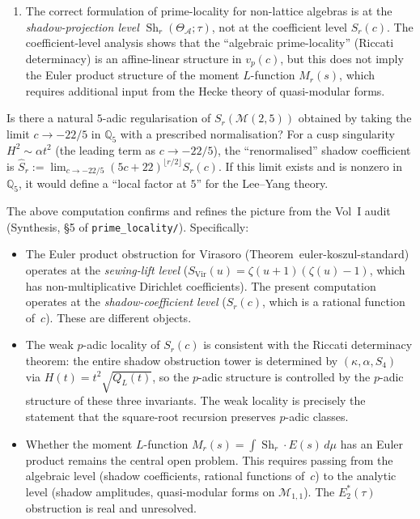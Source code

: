 \documentclass[11pt]{article}
\newcommand{\cA}{\mathcal{A}}
\newcommand{\cM}{\mathcal{M}}
\newcommand{\Q}{\mathbb{Q}}
\begin{document}
\begin{enumerate}[label=\textup{(\arabic*)}]
\item The correct formulation of prime-locality for non-lattice
  algebras is at the \emph{shadow-projection level}
  $\operatorname{Sh}_r(\Theta_\cA; \tau)$, not at the
  coefficient level $S_r(c)$.  The coefficient-level analysis
  shows that the ``algebraic prime-locality'' (Riccati
  determinacy) is an affine-linear structure in $v_p(c)$, but
  this does not imply the Euler product structure of the moment
  $L$-function $M_r(s)$, which requires additional input from
  the Hecke theory of quasi-modular forms.
\end{enumerate}

\begin{question}
\label{q:yang-lee-5-adic}
Is there a natural $5$-adic regularisation of $S_r(\cM(2,5))$
obtained by taking the limit $c \to -22/5$ in $\Q_5$ with a
prescribed normalisation?  For a cusp singularity $H^2 \sim
\alpha t^2$ (the leading term as $c \to -22/5$), the
``renormalised'' shadow coefficient is
$\hat{S}_r := \lim_{c \to -22/5} (5c+22)^{\lfloor r/2
\rfloor} S_r(c)$.  If this limit exists and is nonzero in
$\Q_5$, it would define a ``local factor at $5$'' for the
Lee--Yang theory.
\end{question}

\begin{remark}
The above computation confirms and refines the picture from the
Vol~I audit (Synthesis, \S5 of \texttt{prime\_locality/}).
Specifically:
\begin{itemize}[leftmargin=1.8em]
\item The Euler product obstruction for Virasoro
  (Theorem~\textup{euler-koszul-standard}) operates at the
  \emph{sewing-lift level} ($S_{\mathrm{Vir}}(u) = \zeta(u+1)
  (\zeta(u) - 1)$, which has non-multiplicative Dirichlet
  coefficients).  The present computation operates at the
  \emph{shadow-coefficient level} ($S_r(c)$, which is a
  rational function of~$c$).  These are different objects.

\item The weak $p$-adic locality of $S_r(c)$ is consistent with
  the Riccati determinacy theorem: the entire shadow obstruction tower is
  determined by $(\kappa, \alpha, S_4)$ via
  $H(t) = t^2\sqrt{Q_L(t)}$, so the $p$-adic structure is
  controlled by the $p$-adic structure of these three
  invariants.  The weak locality is precisely the statement that
  the square-root recursion preserves $p$-adic classes.

\item Whether the moment $L$-function $M_r(s) = \int
  \operatorname{Sh}_r \cdot E(s)\,d\mu$ has an Euler product
  remains the central open problem.  This requires passing from
  the algebraic level (shadow coefficients, rational functions
  of~$c$) to the analytic level (shadow amplitudes, quasi-modular
  forms on $\cM_{1,1}$).  The $E_2^*(\tau)$ obstruction is real
  and unresolved.
\end{itemize}
\end{remark}
\end{document}
